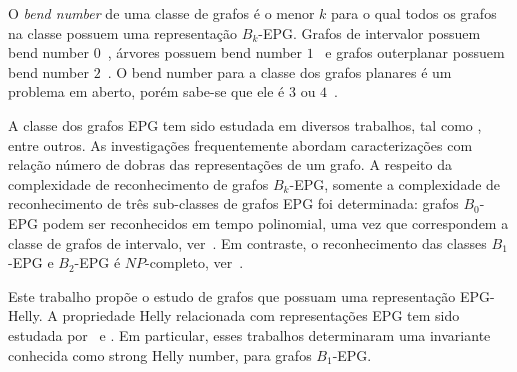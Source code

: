 O \emph{bend number} de uma classe de grafos é o menor  $k$ para o qual todos os grafos na classe possuem uma representação $B_k$-EPG. Grafos de intervalor possuem bend number $0$~\cite{golumbic2009}, árvores possuem  bend number $1$~\cite{golumbic2009} e  grafos outerplanar possuem bend number $2$~\cite{daniel2014b}. O bend number para a classe dos grafos planares é um problema em aberto, porém sabe-se que ele é $ 3 $ ou $4$~\cite{daniel2014b}. %

A classe dos grafos EPG tem sido estudada em diversos trabalhos, tal como  \cite{alcon2016, Asinowski2009, cohen2014, golumbic2009, heldt2014,  martin2017}, entre outros. As investigações frequentemente abordam caracterizações com relação número de dobras das representações de um grafo. A respeito da complexidade de reconhecimento de grafos $B_k$-EPG, somente a complexidade de reconhecimento de três sub-classes de grafos EPG foi determinada:
 grafos $B_0$-EPG podem ser reconhecidos em tempo polinomial, uma vez que correspondem a classe de grafos de intervalo, ver~\cite{booth1976}. Em contraste, o reconhecimento das classes $B_1$-EPG e $B_2$-EPG é $NP$-completo, ver~\cite{heldt2014, martin2017}.







Este trabalho propõe o estudo de grafos que possuam uma representação EPG-Helly. 
A propriedade Helly relacionada com representações EPG tem sido estudada por~\cite{golumbic2009} e \cite{golumbic2013}. Em particular, esses trabalhos determinaram uma invariante conhecida como strong Helly number, para grafos $B_1$-EPG. 

